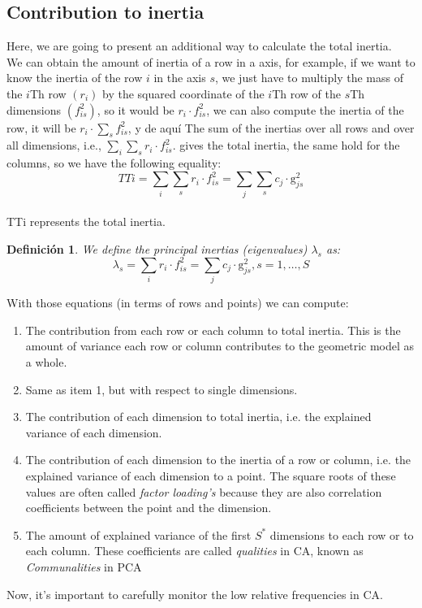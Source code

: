 \documentclass[12pt]{extarticle}
\newtheorem{definition}[theorem]{Definici\'{o}n}
\numberwithin{equation}{section}
\newcommand{\Dsum}{\displaystyle\sum}
\begin{document}
\subsection{Contribution to inertia}
Here, we are going to present an additional way to calculate the total inertia. \\
We can obtain the amount of inertia of a row in a axis, for example, if we want to know the inertia of the row $i$ in the axis $s$, we just have to multiply the mass of the $i$Th row $(r_{i})$ by the squared coordinate of the $i$Th row of the $s$Th dimensions $(f ^2_{is})$, so it would be $r_i \cdot f^2_{is}$, we can also compute the inertia of the row, it will be $r_i \cdot \Dsum_ s f_{is}^2 $, y de aquí The sum of the inertias over all rows and over all dimensions, i.e., $\Dsum_i \Dsum_s r_i \cdot f^2_{is}$. gives the total inertia, the same hold for the columns, so we have the following equality: 
$$ TTi= \Dsum_i \Dsum_s r_i \cdot f^2_{is} = \Dsum_j \Dsum_s c_j \cdot \mathrm{g}^2_{js}$$\\
TTi represents the total inertia.\\
\begin{definition}
We define the principal inertias (eigenvalues) $\lambda_s$ as:  $$\lambda_s = \Dsum_i r_i\cdot f^2_{is} = \Dsum_j c_j\cdot \mathrm{g} ^2_{js}, s = 1,\dots,S$$ 
\end{definition}
With those equations (in  terms of rows and points) we can compute: 
\begin{enumerate}
\item  The contribution from each row or each column to total inertia. This is the amount of variance each row or column contributes to the geometric model as a whole. 
\item Same as item 1, but with respect to single dimensions.
\item  The contribution of each dimension to total inertia, i.e. the explained variance of each dimension. 
\item The contribution of each dimension to the inertia of a row or column, i.e. the explained variance of each dimension to a point. The square roots of these values are often called \emph{factor loading's} because they are also correlation coefficients between the point and the dimension.
\item  The amount of explained variance of the first $S^*$ dimensions to each row or to each column. These coefficients are called \emph{qualities } in CA, known as \emph{Communalities} in PCA
\end{enumerate}
   Now, it's important to carefully monitor  the low relative frequencies in CA.
\end{document}
